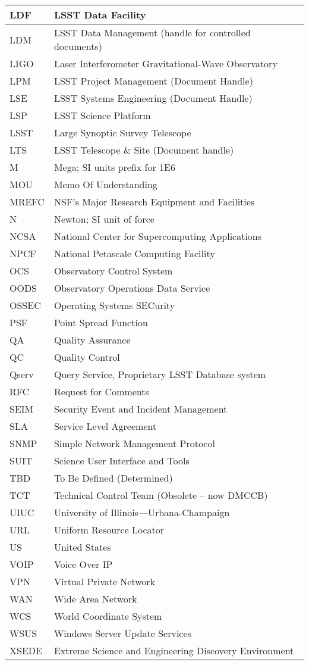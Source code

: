 \begin{longtable}{|l|p{}|}
LDF & LSST Data Facility \\\hline
LDM & LSST Data Management (handle for controlled documents) \\\hline
LIGO & Laser Interferometer Gravitational-Wave Observatory \\\hline
LPM & LSST Project Management (Document Handle) \\\hline
LSE & LSST Systems Engineering (Document Handle) \\\hline
LSP & LSST Science Platform \\\hline
LSST & Large Synoptic Survey Telescope \\\hline
LTS & LSST Telescope \& Site (Document handle) \\\hline
M & Mega; SI units prefix for 1E6 \\\hline
MOU & Memo Of Understanding \\\hline
MREFC & NSF's Major Research Equipment and Facilities \\\hline
N & Newton; SI unit of force \\\hline
NCSA & National Center for Supercomputing Applications \\\hline
NPCF & National Petascale Computing Facility \\\hline
OCS & Observatory Control System \\\hline
OODS & Observatory Operations Data Service \\\hline
OSSEC & Operating Systems SECurity \\\hline
PSF & Point Spread Function \\\hline
QA & Quality Assurance \\\hline
QC & Quality Control \\\hline
Qserv & Query Service, Proprietary LSST Database system \\\hline
RFC & Request for Comments \\\hline
SEIM & Security Event and Incident Management \\\hline
SLA & Service Level Agreement \\\hline
SNMP & Simple Network Management Protocol \\\hline
SUIT & Science User Interface and Tools \\\hline
TBD & To Be Defined (Determined) \\\hline
TCT & Technical Control Team (Obsolete -- now DMCCB) \\\hline
UIUC & University of Illinois—Urbana-Champaign \\\hline
URL & Uniform Resource Locator \\\hline
US & United States \\\hline
VOIP & Voice Over IP \\\hline
VPN & Virtual Private Network \\\hline
WAN & Wide Area Network \\\hline
WCS & World Coordinate System \\\hline
WSUS & Windows Server Update Services \\\hline
XSEDE & Extreme Science and Engineering Discovery Environment \\\hline
\end{longtable}
